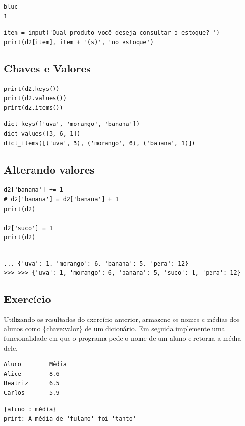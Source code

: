\documentclass[presentation]{beamer}
\begin{document}
\begin{verbatim}
blue
1
\end{verbatim}

\begin{verbatim}
item = input('Qual produto você deseja consultar o estoque? ')
print(d2[item], item + '(s)', 'no estoque')
\end{verbatim}


\subsection{Chaves e Valores}
\label{sec:orgheadline61}
\begin{verbatim}
print(d2.keys()) 
print(d2.values()) 
print(d2.items())
\end{verbatim}

\begin{verbatim}
dict_keys(['uva', 'morango', 'banana'])
dict_values([3, 6, 1])
dict_items([('uva', 3), ('morango', 6), ('banana', 1)])
\end{verbatim}

\subsection{Alterando valores}
\label{sec:orgheadline62}
\begin{verbatim}
d2['banana'] += 1
# d2['banana'] = d2['banana'] + 1 
print(d2)

d2['suco'] = 1
print(d2)
\end{verbatim}

\begin{verbatim}

... {'uva': 1, 'morango': 6, 'banana': 5, 'pera': 12}
>>> >>> {'uva': 1, 'morango': 6, 'banana': 5, 'suco': 1, 'pera': 12}
\end{verbatim}
\subsection{Exercício}
\label{sec:orgheadline63}
Utilizando os resultados do exercício anterior, armazene os nomes e médias dos alunos como \{chave:valor\} de um dicionário. Em seguida implemente uma funcionalidade em que o programa pede o nome de um aluno e retorna a média dele.

\begin{verbatim}
Aluno        Média
Alice        8.6
Beatriz      6.5
Carlos       5.9
\end{verbatim}

\begin{verbatim}
{aluno : média}
print: A média de 'fulano' foi 'tanto'
\end{verbatim}
\end{document}
